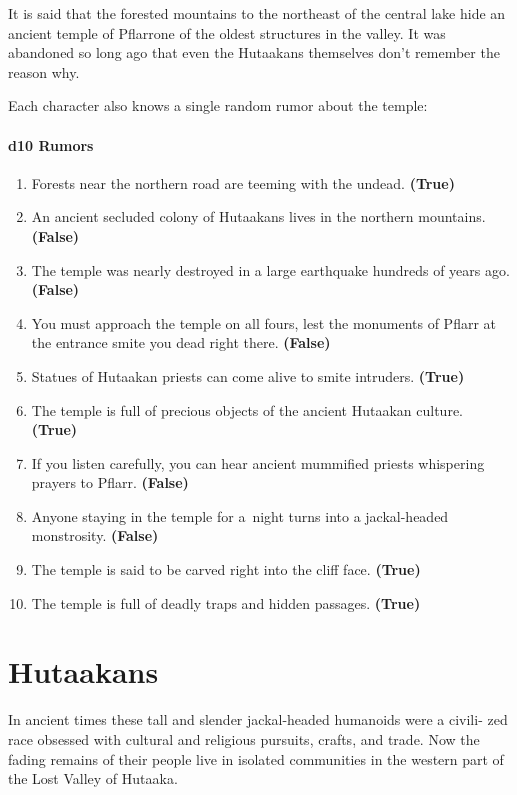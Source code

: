 \documentclass[english,11pt,openany,letterpaper,twocolumn]{book}
\begin{document}
It is said that the forested mountains to the northeast of the central lake hide an ancient temple of Pflarr\dash one of the oldest structures in the valley. It was abandoned so long ago that even the Hutaakans themselves don't remember the reason why.

\tab Each character also knows a single random rumor about the temple:

\paragraph{d10 Rumors}
\begin{enumerate}
	\item Forests near the northern road are teeming with the undead. \textbf{(True)}
	\item An ancient secluded colony of Hutaakans lives in the northern mountains. \textbf{(False)}
	\item The temple was nearly destroyed in a large earthquake hundreds of years ago. \textbf{(False)}
	\item You must approach the temple on all fours, lest the monuments of Pflarr at the entrance smite you dead right there. \textbf{(False)}
	\item Statues of Hutaakan priests can come alive to smite intruders. \textbf{(True)}
	\item The temple is full of precious objects of the ancient Hutaakan culture. \textbf{(True)}
	\item If you listen carefully, you can hear ancient mummified priests whispering prayers to Pflarr. \textbf{(False)}
	\item Anyone staying in the temple for a~night turns into a jackal-headed monstrosity. \textbf{(False)}
	\item The temple is said to be carved right into the cliff face. \textbf{(True)}
	\item The temple is full of deadly traps and hidden passages. \textbf{(True)}
\end{enumerate}

\break

\section{Hutaakans}

In ancient times these tall and slender jackal-headed humanoids were a civili- zed race obsessed with cultural and religious pursuits, crafts, and trade. Now the fading remains of their people live in isolated communities in the western part of the Lost Valley of Hutaaka.
\end{document}
